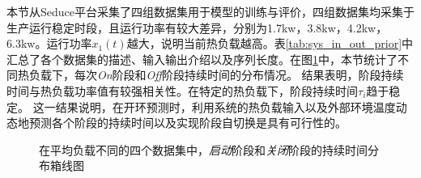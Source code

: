 本节从Seduce平台采集了四组数据集用于模型的训练与评价，四组数据集均采集于生产运行稳定时段，且运行功率有较大差异，分别为1.7kw，3.8kw，4.2kw，6.3kw。运行功率$x_1(t)$越大，说明当前热负载越高。表\ref{tab:sys_in_out_prior}中汇总了各个数据集的描述、输入输出介绍以及序列长度。在图\ref{fig:state}中，本节统计了不同热负载下，每次\textit{On}阶段和\textit{Off}阶段持续时间的分布情况。
结果表明，阶段持续时间与热负载功率值有较强相关性。在特定的热负载下，阶段持续时间${\tau}_{i}$趋于稳定。
这一结果说明，在开环预测时，利用系统的热负载输入以及外部环境温度动态地预测各个阶段的持续时间以及实现阶段自切换是具有可行性的。
\begin{figure}
\centering
\hspace{-0.1in}
\hspace{-0.05in}
\caption{
在平均负载不同的四个数据集中，\textit{启动}阶段和\textit{关闭}阶段的持续时间分布箱线图
} %
\label{fig:state}  %
\end{figure}

